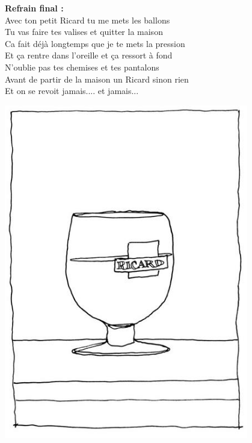\textbf{Refrain final :}
\\Avec ton petit Ricard tu me mets les ballons
\\Tu vas faire tes valises et quitter la maison
\\Ca fait déjà longtemps que je te mets la pression
\\Et ça rentre dans l'oreille et ça ressort à fond
\\N'oublie pas tes chemises et tes pantalons
\\Avant de partir de la maison un Ricard sinon rien
\\Et on se revoit jamais.... et jamais...
\\
\begin{center}
\includegraphics[width=0.8\textwidth]{images/Ricard.jpg}
\end{center}

\breakpage